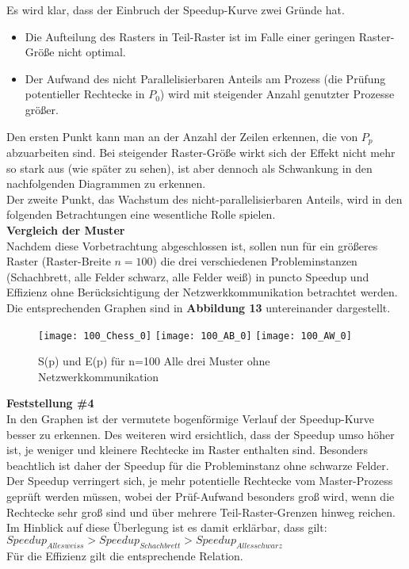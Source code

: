 \documentclass[
10pt, %
a4paper, %
oneside, %
headinclude,footinclude, %
BCOR5mm, %
]{scrartcl}
\begin{document}
Es wird klar, dass der Einbruch der Speedup-Kurve zwei Gründe hat.

\begin{itemize}[noitemsep] %
	\item Die Aufteilung des Rasters in Teil-Raster ist im Falle einer geringen Raster-Größe nicht optimal.
	\item Der Aufwand des nicht Parallelisierbaren Anteils am Prozess (die Prüfung potentieller Rechtecke in \(P_{0}\)) wird mit steigender Anzahl genutzter Prozesse größer.
\end{itemize}

Den ersten Punkt kann man an der Anzahl der Zeilen erkennen, die von \(P_{p}\) abzuarbeiten sind. Bei steigender Raster-Größe wirkt sich der Effekt nicht mehr so stark aus (wie später zu sehen), ist aber dennoch als Schwankung in den nachfolgenden Diagrammen zu erkennen.\\
Der zweite Punkt, das Wachstum des nicht-parallelisierbaren Anteils, wird in den folgenden Betrachtungen eine wesentliche Rolle spielen. \\
 
\textbf{Vergleich der Muster}\\
Nachdem diese Vorbetrachtung abgeschlossen ist, sollen nun für ein größeres Raster (Raster-Breite \(n=100\)) die drei verschiedenen Probleminstanzen (Schachbrett, alle Felder schwarz, alle Felder weiß) in puncto Speedup und Effizienz ohne Berücksichtigung der Netzwerkkommunikation betrachtet werden.
Die entsprechenden Graphen sind in \textbf{Abbildung 13} untereinander dargestellt.\\

\begin{figure}[h]
	\centering 
	\texttt{[image: 100\_Chess\_0]} 
	\texttt{[image: 100\_AB\_0]} 
	\texttt{[image: 100\_AW\_0]} 
	\caption[S(p) und E(p) für n=100 Alle drei Muster ohne Netzwerkkomm.]{S(p) und E(p) für n=100 Alle drei Muster ohne Netzwerkkommunikation}
\end{figure}

\textbf{Feststellung \#4}\\
In den Graphen ist der vermutete bogenförmige Verlauf der Speedup-Kurve besser zu erkennen. Des weiteren wird ersichtlich, dass der Speedup umso höher ist, je weniger und kleinere Rechtecke im Raster enthalten sind. Besonders beachtlich ist daher der Speedup für die Probleminstanz ohne schwarze Felder.\\
Der Speedup verringert sich, je mehr potentielle Rechtecke vom Master-Prozess geprüft werden müssen, wobei der Prüf-Aufwand besonders groß wird, wenn die Rechtecke sehr groß sind und über mehrere Teil-Raster-Grenzen hinweg reichen. \\
Im Hinblick auf diese Überlegung ist es damit erklärbar, dass gilt:\\
\(Speedup_{Alles weiss} > Speedup_{Schachbrett} > Speedup_{Alles schwarz} \)\\
Für die Effizienz gilt die entsprechende Relation.\\
\end{document}
